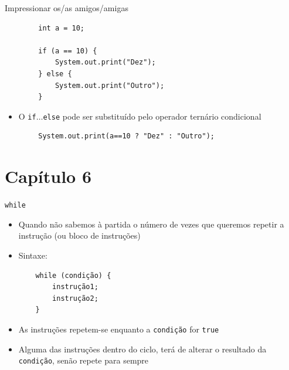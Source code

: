 \documentclass[portuguese, aspectratio=169, xcolor=table]{beamer}
\begin{document}
\begin{frame}[fragile]{Impressionar os/as amigos/amigas}



\begin{verbatim}
        int a = 10;

        if (a == 10) {
            System.out.print("Dez");
        } else {
            System.out.print("Outro");
        }
\end{verbatim}
\begin{itemize}
    \item O \texttt{if}$\ldots$\texttt{else} pode ser substituído pelo operador ternário condicional
\end{itemize}
\begin{verbatim}
        System.out.print(a==10 ? "Dez" : "Outro");
\end{verbatim}

\end{frame}

\section{Capítulo 6}

\begin{frame}[fragile]{\texttt{while}}
\begin{itemize}
    \item Quando não sabemos à partida o número de vezes que queremos repetir a instrução (ou bloco de instruções)
    \item Sintaxe:
    \begin{verbatim}
    while (condição) {
        instrução1;
        instrução2;
    }
    \end{verbatim}
    \item As instruções repetem-se enquanto a \texttt{condição} for \texttt{true}
    \item Alguma das instruções dentro do ciclo, terá de alterar o resultado da \texttt{condição}, senão repete para sempre
\end{itemize}
\end{frame}
\end{document}
